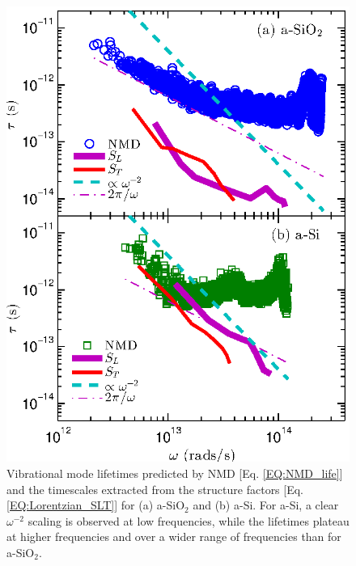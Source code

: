 \documentclass[aps,prb,onecolumn,preprint,superscriptaddress,footinbib,amsmath,amssymb,floatfix]{revtex4}
\begin{document}
\begin{figure}
\begin{center}
\includegraphics[scale=1.0]
{fig4.eps}
\vspace*{-5mm}
\end{center}
\caption{\label{FIG:Lifetimes} Vibrational mode lifetimes predicted by 
NMD [Eq. \eqref{EQ:NMD_life}] and the timescales extracted from the 
structure factors 
[Eq. \eqref{EQ:Lorentzian_SLT}] for (a) a-SiO$_2$ and (b) a-Si. 
For a-Si, a clear $\omega^{-2}$ scaling is observed at low frequencies, 
while the lifetimes plateau at higher frequencies and 
over a wider range of frequencies than for a-SiO$_2$.}
\end{figure}
\end{document}
